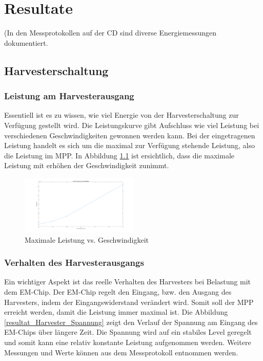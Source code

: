 \chapter{Resultate}
\label{ch_resultat}

(In den Messprotokollen  auf der CD sind diverse Energiemessungen dokumentiert.
 
\section{Harvesterschaltung}

\subsection{Leistung am Harvesterausgang}

Essentiell ist es zu wissen, wie viel Energie von der Harvesterschaltung zur Verfügung gestellt wird. Die Leistungskurve gibt Aufschluss wie viel Leistung bei verschiedenen Geschwindigkeiten gewonnen werden kann. Bei der eingetragenen Leistung handelt es sich um die maximal zur Verfügung stehende Leistung, also die Leistung im MPP. In Abbildung \ref{mpp_resultat_harvester} ist ersichtlich, dass die maximale Leistung mit erhöhen der Geschwindigkeit zunimmt.

\begin{figure}[ht]
    \includegraphics[width=0.5\textwidth]{4Resultate/imag/ResultatLeistungGeschwindigkeit.png} 
    \caption{Maximale Leistung vs. Geschwindigkeit}
    \label{mpp_resultat_harvester}
\end{figure}

\subsection{Verhalten des Harvesterausgangs}
Ein wichtiger Aspekt ist das reelle Verhalten des Harvesters bei Belastung mit dem EM-Chip. Der EM-Chip regelt den Eingang, bzw. den Ausgang des Harvesters, indem der Eingangswiderstand verändert wird. Somit soll der MPP erreicht werden, damit die Leistung immer maximal ist. Die Abbildung \ref{resultat_Harvester_Spannung} zeigt den Verlauf der Spannung am Eingang des EM-Chips über längere Zeit. Die Spannung wird auf ein stabiles Level geregelt und somit kann eine relativ konstante Leistung aufgenommen werden. Weitere Messungen und Werte können aus dem Messprotokoll  entnommen werden.

